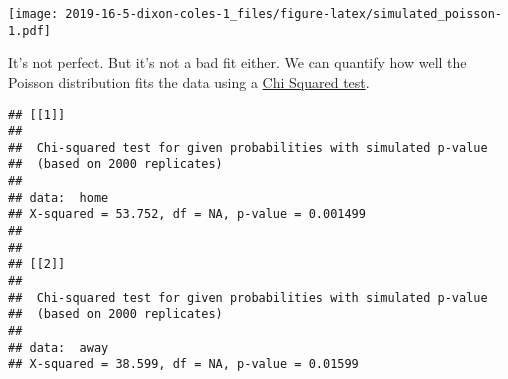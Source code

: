\documentclass[]{article}
\newenvironment{Shaded}{\begin{snugshade}}{\end{snugshade}}
\newcommand{\KeywordTok}[1]{\textcolor[rgb]{0.13,0.29,0.53}{\textbf{#1}}}
\newcommand{\DataTypeTok}[1]{\textcolor[rgb]{0.13,0.29,0.53}{#1}}
\newcommand{\DecValTok}[1]{\textcolor[rgb]{0.00,0.00,0.81}{#1}}
\newcommand{\StringTok}[1]{\textcolor[rgb]{0.31,0.60,0.02}{#1}}
\newcommand{\CommentTok}[1]{\textcolor[rgb]{0.56,0.35,0.01}{\textit{#1}}}
\newcommand{\OtherTok}[1]{\textcolor[rgb]{0.56,0.35,0.01}{#1}}
\newcommand{\ControlFlowTok}[1]{\textcolor[rgb]{0.13,0.29,0.53}{\textbf{#1}}}
\newcommand{\OperatorTok}[1]{\textcolor[rgb]{0.81,0.36,0.00}{\textbf{#1}}}
\newcommand{\NormalTok}[1]{#1}
\begin{document}
\texttt{[image: 2019-16-5-dixon-coles-1\_files/figure-latex/simulated\_poisson-1.pdf]}

It's not perfect. But it's not a bad fit either. We can quantify how
well the Poisson distribution fits the data using a
\href{https://stats.stackexchange.com/questions/92627/how-to-use-the-chi-squared-test-to-determine-if-data-follow-the-poisson-distribu}{Chi
Squared test}.

\begin{Shaded}
\end{Shaded}

\begin{verbatim}
## [[1]]
## 
##  Chi-squared test for given probabilities with simulated p-value
##  (based on 2000 replicates)
## 
## data:  home
## X-squared = 53.752, df = NA, p-value = 0.001499
## 
## 
## [[2]]
## 
##  Chi-squared test for given probabilities with simulated p-value
##  (based on 2000 replicates)
## 
## data:  away
## X-squared = 38.599, df = NA, p-value = 0.01599
\end{verbatim}
\end{document}
